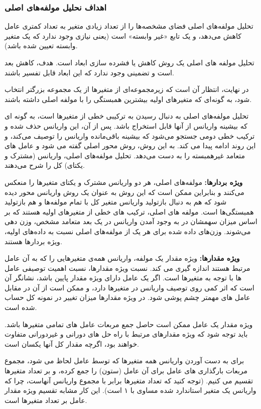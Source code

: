 \subsubsection{
اهداف نحلیل مولفه‌های اصلی
}

تحلیل مولفه‌های اصلی فضای مشخصه‌ها را از تعداد زیادی متغیر به تعداد کمتری عامل کاهش می‌دهد، و یک تابع «غیر وابسته» است (یعنی نیازی وجود ندارد که یک متغیر وابسته تعیین شده باشد).

تحلیل مولفه های اصلی یک روش کاهش یا فشرده سازی ابعاد است. هدف، کاهش بعد است و تضمینی وجود ندارد که این ابعاد قابل تفسیر باشند.

در نهایت، انتظار آن است که زیرمجموعه‌ای از متغیرها از یک مجموعه بزرگتر انتخاب شود، به گونه‌ای که متغیرهای اولیه بیشترین همبستگی را با مولفه اصلی داشته باشند.

تحلیل مولفه‌های اصلی به دنبال رسیدن به ترکیبی خطی از متغیرها است، به گونه ای که بیشینه واریانس از آنها قابل استخراج باشد. پس از آن، این واریانس حذف شده و ترکیب خطی دومی جستجو می‌شود که بیشینه باقی‌مانده واریانس را توصیف می‌کند، و این روند ادامه پیدا می کند. به این روش، روش محور اصلی گفته می شود و عامل های متعامد غیرهمبسته را به دست می‌دهد. تحلیل مولفه‌های اصلی، واریانس (مشترک و یکتای) کل را شرح می‌دهند.

\textbf{
ویژه بردارها:
} مولفه‌های اصلی، هر دو واریانس مشترک و یکتای متغیرها را منعکس می‌کنند و بنابراین ممکن است که این روش به عنوان یک روش واریانس محور دیده شود که هم به دنبال بازتولید واریانس متغیر کل با تمام مولفه‌ها و هم بازتولید همبستگی‌ها است.
مولفه های اصلی، ترکیب های خطی از متغیرهای اولیه هستند که بر اساس میزان سهمشان در به وجود آمدن واریانس در یک بعد متعامد مشخص، وزن دهی می‌شوند. وزن‌های داده شده برای هر یک از مولفه‌های اصلی نسبت به داده‌های اولیه، ویژه بردارها هستند.

\textbf{
ویژه مقدارها:
}
 ویژه مقدار یک مولفه، واریانس همه‌ی متغیرهایی را که به آن عامل مرتبط هستند اندازه گیری می کند.
نسبت ویژه مقدارها، نسبت اهمیت توصیفی عامل ها با توجه به متغیرها است. اگر یک عامل دارای ویژه مقدار پایین باشد، نشانگر آن است که اثر کمی روی توصیف واریانس در متغیرها دارد، و ممکن است از آن در مقابل عامل های مهمتر چشم پوشی شود.
در ویژه مقدارها میزان تغییر در نمونه کل حساب شده است.

ویژه مقدار یک عامل ممکن است حاصل جمع مربعات عامل های تمامی متغیرها باشد. باید توجه شود که ویژه مقدارهای مرتبط با راه حل های دورانی و غیردورانی متفاوت خواهند بود، اگرچه مقدار کل آنها یکسان است.

برای به دست آوردن واریانس همه متغیرها که توسط عامل لحاظ می شود، مجموع مربعات بارگذاری های عامل برای آن عامل (ستون) را جمع کرده، و بر تعداد متغیرها تقسیم می کنیم. (توجه کنید که تعداد متغیرها برابر با مجموع واریانس آنهاست، چرا که واریانس یک متغیر استاندارد شده مساوی با ۱ است). این کار مشابه تقسیم ویژه مقدار عامل بر تعداد متغیرها است.

